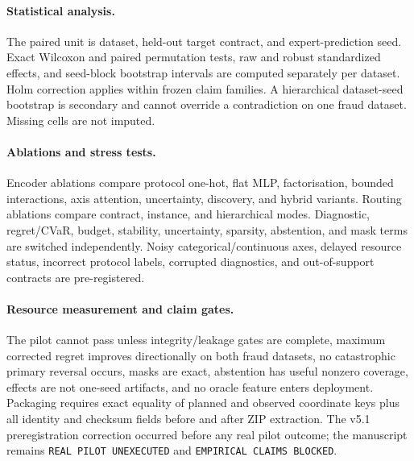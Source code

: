 \paragraph{Statistical analysis.}
The paired unit is dataset, held-out target contract, and expert-prediction seed. Exact Wilcoxon and paired permutation tests, raw and robust standardized effects, and seed-block bootstrap intervals are computed separately per dataset. Holm correction applies within frozen claim families. A hierarchical dataset-seed bootstrap is secondary and cannot override a contradiction on one fraud dataset. Missing cells are not imputed.

\paragraph{Ablations and stress tests.}
Encoder ablations compare protocol one-hot, flat MLP, factorisation, bounded interactions, axis attention, uncertainty, discovery, and hybrid variants. Routing ablations compare contract, instance, and hierarchical modes. Diagnostic, regret/CVaR, budget, stability, uncertainty, sparsity, abstention, and mask terms are switched independently. Noisy categorical/continuous axes, delayed resource status, incorrect protocol labels, corrupted diagnostics, and out-of-support contracts are pre-registered.

\paragraph{Resource measurement and claim gates.}
The pilot cannot pass unless integrity/leakage gates are complete, maximum corrected regret improves directionally on both fraud datasets, no catastrophic primary reversal occurs, masks are exact, abstention has useful nonzero coverage, effects are not one-seed artifacts, and no oracle feature enters deployment. Packaging requires exact equality of planned and observed coordinate keys plus all identity and checksum fields before and after ZIP extraction. The v5.1 preregistration correction occurred before any real pilot outcome; the manuscript remains \texttt{REAL PILOT UNEXECUTED} and \texttt{EMPIRICAL CLAIMS BLOCKED}.
